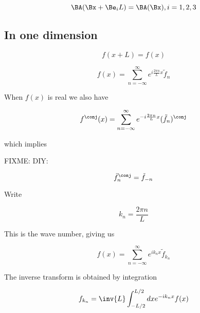 \begin{equation}\label{eqn:relativisticElectrodynamicsL15:170}
\BA(\Bx + \Be_i L) = \BA(\Bx), i = 1,2,3
\end{equation}

\subsection{In one dimension}

\begin{equation}\label{eqn:relativisticElectrodynamicsL15:190}
f(x + L) = f(x)
\end{equation}

\begin{equation}\label{eqn:relativisticElectrodynamicsL15:210}
f(x) = \sum_{n=-\infty}^\infty e^{i \frac{2 \pi n}{L} x} \tilde{f}_n
\end{equation}

When $f(x)$ is real we also have

\begin{equation}\label{eqn:relativisticElectrodynamicsL15:230}
f^\conj(x) = \sum_{n = -\infty}^\infty e^{-i \frac{2 \pi n}{L} x} (\tilde{f}_n)^\conj
\end{equation}

which implies

FIXME: DIY: 

\begin{equation}\label{eqn:relativisticElectrodynamicsL15:250}
{\tilde{f}^\conj}_{n} = \tilde{f}_{-n}
\end{equation}

Write 

\begin{equation}\label{eqn:relativisticElectrodynamicsL15:270}
k_n = \frac{2 \pi n}{L}
\end{equation}

This is the wave number, giving us

\begin{equation}\label{eqn:relativisticElectrodynamicsL15:290}
f(x) = \sum_{n=-\infty}^\infty e^{i k_n x} \tilde{f}_{k_n}
\end{equation}

The inverse transform is obtained by integration

\begin{equation}\label{eqn:relativisticElectrodynamicsL15:310}
f_{k_n} = \inv{L} \int_{-L/2}^{L/2} dx e^{-i k_n x} f(x)
\end{equation}

